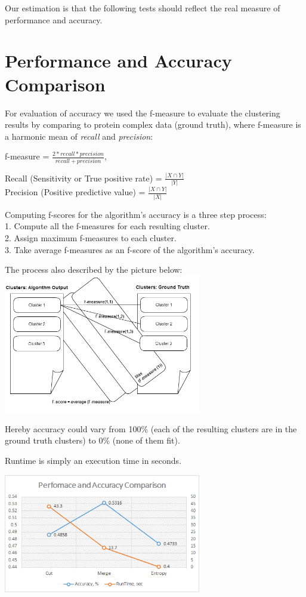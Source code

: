 \documentclass[journal]{IEEEtran}
\begin{document}
Our estimation is that the following tests should reflect the real measure of performance and accuracy.



\section{Performance and Accuracy Comparison}
For evaluation of accuracy we used the f-measure to evaluate the clustering results by comparing to protein complex data (ground truth), where f-measure is a harmonic mean of \textit{recall} and \textit{precision}:
\begin{center}
	f-measure = $\frac{2 * recall * precision}{recall + precision} $,\\	
\end{center} 
Recall (Sensitivity or True positive rate) = $\frac{|X \cap Y|}{|Y|}$\\
Precision (Positive predictive value) =  $\frac{|X \cap Y|}{|X|}$

Computing f-scores for the algorithm's accuracy is a three step process:\\
1. Compute all the f-measures for each resulting cluster.\\
2. Assign maximum f-measures to each cluster.\\
3. Take average f-measures as an f-score of the algorithm's accuracy. 

The process also described by the picture below:
\includegraphics[width=3.4in,clip,keepaspectratio]{f-measure}

Hereby accuracy could vary from 100\% (each of the resulting clusters are in the ground truth clusters) to 0\% (none of them fit).

Runtime is simply an execution time in seconds.

\includegraphics[width=3.4in,clip,keepaspectratio]{perfomance-comparison}
\end{document}
